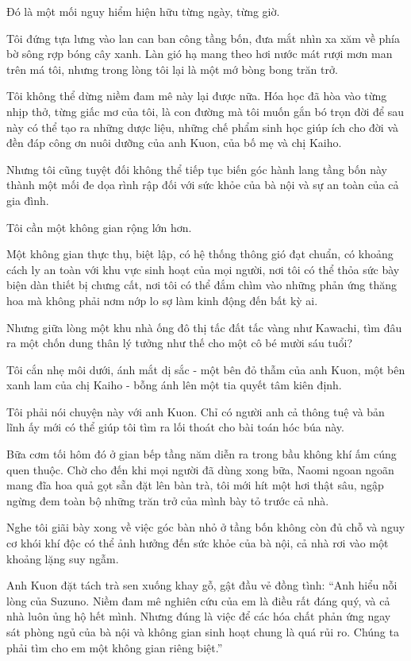 \documentclass[../main.tex]{subfiles}
\begin{document}
Đó là một mối nguy hiểm hiện hữu từng ngày, từng giờ.

Tôi đứng tựa lưng vào lan can ban công tầng bốn, đưa mắt nhìn xa xăm về phía bờ sông rợp bóng cây xanh. Làn gió hạ mang theo hơi nước mát rượi mơn man trên má tôi, nhưng trong lòng tôi lại là một mớ bòng bong trăn trở.

Tôi không thể dừng niềm đam mê này lại được nữa. Hóa học đã hòa vào từng nhịp thở, từng giấc mơ của tôi, là con đường mà tôi muốn gắn bó trọn đời để sau này có thể tạo ra những dược liệu, những chế phẩm sinh học giúp ích cho đời và đền đáp công ơn nuôi dưỡng của anh Kuon, của bố mẹ và chị Kaiho.

Nhưng tôi cũng tuyệt đối không thể tiếp tục biến góc hành lang tầng bốn này thành một mối đe dọa rình rập đối với sức khỏe của bà nội và sự an toàn của cả gia đình.

Tôi cần một không gian rộng lớn hơn.

Một không gian thực thụ, biệt lập, có hệ thống thông gió đạt chuẩn, có khoảng cách ly an toàn với khu vực sinh hoạt của mọi người, nơi tôi có thể thỏa sức bày biện dàn thiết bị chưng cất, nơi tôi có thể đắm chìm vào những phản ứng thăng hoa mà không phải nơm nớp lo sợ làm kinh động đến bất kỳ ai.

Nhưng giữa lòng một khu nhà ống đô thị tấc đất tấc vàng như Kawachi, tìm đâu ra một chốn dung thân lý tưởng như thế cho một cô bé mười sáu tuổi?

Tôi cắn nhẹ môi dưới, ánh mắt dị sắc - một bên đỏ thẫm của anh Kuon, một bên xanh lam của chị Kaiho - bỗng ánh lên một tia quyết tâm kiên định.

Tôi phải nói chuyện này với anh Kuon. Chỉ có người anh cả thông tuệ và bản lĩnh ấy mới có thể giúp tôi tìm ra lối thoát cho bài toán hóc búa này.

\ct

Bữa cơm tối hôm đó ở gian bếp tầng năm diễn ra trong bầu không khí ấm cúng quen thuộc. Chờ cho đến khi mọi người đã dùng xong bữa, Naomi ngoan ngoãn mang đĩa hoa quả gọt sẵn đặt lên bàn trà, tôi mới hít một hơi thật sâu, ngập ngừng đem toàn bộ những trăn trở của mình bày tỏ trước cả nhà.

Nghe tôi giãi bày xong về việc góc bàn nhỏ ở tầng bốn không còn đủ chỗ và nguy cơ khói khí độc có thể ảnh hưởng đến sức khỏe của bà nội, cả nhà rơi vào một khoảng lặng suy ngẫm.

Anh Kuon đặt tách trà sen xuống khay gỗ, gật đầu vẻ đồng tình: ``Anh hiểu nỗi lòng của Suzuno. Niềm đam mê nghiên cứu của em là điều rất đáng quý, và cả nhà luôn ủng hộ hết mình. Nhưng đúng là việc để các hóa chất phản ứng ngay sát phòng ngủ của bà nội và không gian sinh hoạt chung là quá rủi ro. Chúng ta phải tìm cho em một không gian riêng biệt.''
\end{document}

